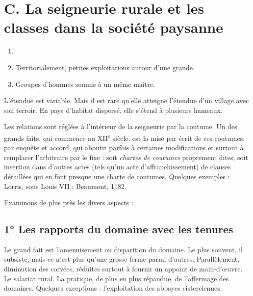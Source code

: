\documentclass[french,twoside]{book} %
\begin{document}
\section[C. La seigneurie rurale et les classes dans la société paysanne]{C. La seigneurie rurale et les classes dans la société paysanne \protect\footnotemark}
\label{c07c}

\begin{enumerate}[itemsep=0pt,]
\item[] \hspace{-1.5em}{\bfseries Définitions :}
\item Territorialement, petites exploitations autour d’une grande.
\item Groupes d’hommes soumis à un même maître.

\end{enumerate}\noindent L’étendue est variable. Mais il est rare qu’elle atteigne l’étendue d’un village avec son terroir. En pays d’habitat dispersé, elle s’étend à plusieurs hameaux.\par
Les relations sont réglées à l’intérieur de la seigneurie par la coutume. Un des grands faits, qui commence au XII\textsuperscript{e} siècle, est la mise par écrit de ces coutumes, par enquête et accord, qui aboutit parfois à certaines modifications et surtout à remplacer l’arbitraire  
\label{p57} par le fixe : soit \emph{chartes de coutumes} proprement dites, soit insertion dans d’autres actes (tels qu’un acte d’affranchissement) de clauses détaillées qui en font presque une charte de coutumes. Quelques exemples : Lorris, sous Louis VII ; Beaumont, 1182.\par
Examinons de plus près les divers aspects :\par
\subsection[1° Les rapports du domaine avec les tenures]{1° Les rapports du domaine avec les tenures}
\noindent Le grand fait est l’amenuisement ou disparition du domaine. Le plus souvent, il subsiste, mais ce n’est plus qu’une grosse ferme parmi d’autres. Parallèlement, diminution des corvées, réduites surtout à fournir un appoint de main-d’œuvre. Le salariat rural. La pratique, de plus en plus répandue, de l’affermage des domaines. Quelques exceptions : l’exploitation des abbayes cisterciennes.
\end{document}
